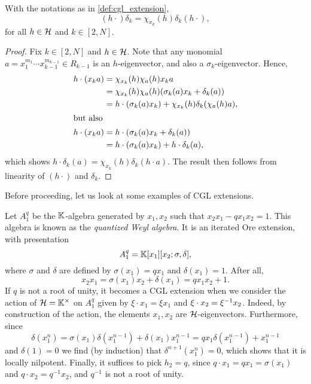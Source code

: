 \begin{lemma}\label{lem:h_after_delta}
	With the notations as in \cref{def:cgl_extension},
	\begin{equation*}
		(h\cdot )\delta_k = \chi_{x_k}(h)\delta_k(h\cdot),
	\end{equation*}
	for all $h \in \mathcal{H}$ and $k \in [2, N]$.
\end{lemma}
\begin{proof}
	Fix $k \in [2, N]$ and $h \in \mathcal{H}$. Note that any monomial $a = x_1^{m_1}\cdots x_{k-1}^{m_{k-1}} \in R_{k-1}$ is an $h$-eigenvector, and also a $\sigma_k$-eigenvector. Hence,
	\begin{align*}
		h \cdot(x_k a)  & = \chi_{x_k}(h)\chi_{a}(h)x_ka                                      \\
		                & = \chi_{x_k}(h)\chi_{a}(h)(\sigma_k (a)x_k +  \delta_k(a))          \\
		                & = h \cdot (\sigma_k (a) x_k) + \chi_{x_k}(h)\delta_k(\chi_{a}(h)a), \\
		\shortintertext{but also}
		h \cdot (x_k a) & = h \cdot (\sigma_k (a) x_k + \delta_k(a))                          \\
		                & = h \cdot (\sigma_k (a) x_k) + h\cdot \delta_k(a),
	\end{align*}
	which shows $h \cdot \delta_k (a) = \chi_{x_k}(h) \delta_k (h \cdot a)$. The result then follows from linearity of $(h \cdot)$ and $\delta_k$.
\end{proof}

Before proceeding, let us look at some examples of CGL extensions.

\begin{example}
	Let $A_1^q$ be the $\mathbb{K}$-algebra generated by $x_1, x_2$ such that $x_2 x_1 - q x_1 x_2 = 1$. This algebra is known as the \emph{quantized Weyl algebra}. It is an iterated Ore extension, with presentation
	\begin{equation*}
		A_1^q = \mathbb{K}[x_1][x_2; \sigma, \delta],
	\end{equation*}
	where $\sigma$ and $\delta$ are defined by $\sigma(x_1) = q x_1$ and $\delta(x_1) = 1$.
	After all,
	\begin{equation*}
		x_2 x_1 = \sigma(x_1) x_2 + \delta(x_1) = q x_1 x_2 + 1.
	\end{equation*}
	If $q$ is not a root of unity, it becomes a CGL extension when we consider the action
	of $\mathcal{H} = \mathbb{K}^\times$ on $A_1^q$ given by $\xi \cdot x_1 = \xi x_1$ and $\xi \cdot
		x_2 = \xi^{-1} x_2$. Indeed, by construction of the action, the elements $x_1, x_2$ are
	$\mathcal{H}$-eigenvectors. Furthermore, since
	\begin{equation*}
		\delta(x_1^n) = \sigma(x_1)\delta(x_1^{n-1}) + \delta(x_1)x_1^{n-1} = q x_1 \delta(x_1^{n-1}) + x_1^{n-1}
	\end{equation*}
	and $\delta(1) = 0$ we find (by induction) that $\delta^{n+1}(x_1^n) = 0$, which shows
	that it is locally nilpotent. Finally, it suffices to pick $h_2 = q$, since $q \cdot
		x_1 = qx_1 = \sigma(x_1)$ and $q \cdot x_2 = q^{-1}x_2$, and $q^{-1}$ is not a root of
	unity.
\end{example}


